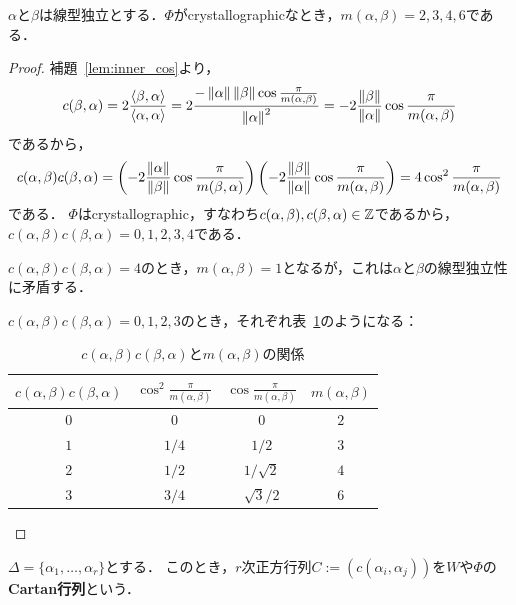 \begin{proposition}
  $\alpha$と$\beta$は線型独立とする．$\Phi$がcrystallographicなとき，$m(\alpha, \beta) = 2, 3, 4, 6$である．
\end{proposition}

\begin{proof}
  補題~\ref{lem:inner_cos}より，
  \begin{equation}
    c(\beta, \alpha)
    = 2\frac{\left\langle \beta, \alpha \right\rangle}{\left\langle \alpha, \alpha \right\rangle}
    = 2\frac{-\left\| \alpha \right\| \left\| \beta \right\| \cos\frac{\pi}{m(\alpha, \beta)}}{\left\| \alpha \right\|^2}
    = -2\frac{\left\| \beta \right\|}{\left\| \alpha \right\|} \cos\frac{\pi}{m(\alpha, \beta)}
  \end{equation}
  であるから，
  \begin{equation}
    c(\alpha, \beta) c(\beta, \alpha)
    = \left( -2\frac{\left\| \alpha \right\|}{\left\| \beta \right\|} \cos\frac{\pi}{m(\beta, \alpha)} \right) \left( -2\frac{\left\| \beta \right\|}{\left\| \alpha \right\|} \cos\frac{\pi}{m(\alpha, \beta)} \right)
    = 4\cos^2 \frac{\pi}{m(\alpha, \beta)}
  \end{equation}
  である．
  $\Phi$はcrystallographic，すなわち$c(\alpha, \beta), c(\beta, \alpha) \in \mathbb{Z}$であるから，$c(\alpha, \beta) c(\beta, \alpha) = 0, 1, 2, 3, 4$である．

  $c(\alpha, \beta) c(\beta, \alpha) = 4$のとき，$m(\alpha, \beta) = 1$となるが，これは$\alpha$と$\beta$の線型独立性に矛盾する．

  $c(\alpha, \beta) c(\beta, \alpha) = 0, 1, 2, 3$のとき，それぞれ表~\ref{table:c_m_relation}のようになる：
  \begin{table}[htbp]
    \centering
    \caption{$c(\alpha, \beta) c(\beta, \alpha)$と$m(\alpha, \beta)$の関係}
    \label{table:c_m_relation}
    \begin{tabular}{cccc}
      $c(\alpha, \beta) c(\beta, \alpha)$ & $\cos^2 \frac{\pi}{m(\alpha, \beta)}$ & $\cos\frac{\pi}{m(\alpha, \beta)}$ & $m(\alpha, \beta)$\\ \hline
      $0$ & $0$ & $0$ & $2$ \\
      $1$ & $1/4$ & $1/2$ & $3$\\
      $2$ & $1/2$ & $1/\sqrt2$ & $4$\\
      $3$ & $3/4$ & $\sqrt{3}/2$ & $6$
    \end{tabular}
  \end{table}
\end{proof}

\begin{definition}
  $\Delta = \{\alpha_1, \ldots, \alpha_r\}$とする．
  このとき，$r$次正方行列$C := (c(\alpha_i, \alpha_j))$を$W$や$\Phi$の\textbf{Cartan行列}という．
\end{definition}

